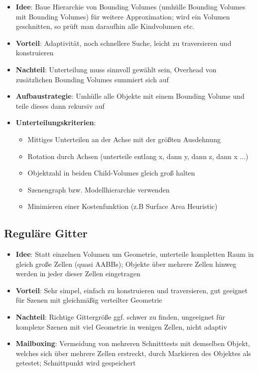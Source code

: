 \begin{itemize}
	\item \textbf{Idee}: Baue Hierarchie von Bounding Volumes (umhülle Bounding Volumes mit Bounding Volumes) für weitere Approximation; wird ein Volumen geschnitten, so prüft man daraufhin alle Kindvolumen etc.
	\item \textbf{Vorteil}: Adaptivität, noch schnellere Suche, leicht zu traversieren und konstruieren
	\item \textbf{Nachteil}: Unterteilung muss sinnvoll gewählt sein, Overhead von zusätzlichen Bounding Volumes summiert sich auf
	\item \textbf{Aufbaustrategie}: Umhülle alle Objekte mit einem Bounding Volume und teile dieses dann rekursiv auf
	\item \textbf{Unterteilungskriterien}:
	\begin{itemize}
		\item Mittiges Unterteilen an der Achse mit der größten Ausdehnung
		\item Rotation durch Achsen (unterteile entlang x, dann y, dann z, dann x ...)
		\item Objektzahl in beiden Child-Volumes gleich groß halten
		\item Szenengraph bzw. Modellhierarchie verwenden
		\item Minimieren einer Kostenfunktion (z.B Surface Area Heuristic)
	\end{itemize}
\end{itemize}

\subsection{Reguläre Gitter}%
\label{ds:sub:regulaere_gitter}

\begin{itemize}
	\item \textbf{Idee}: Statt einzelnen Volumen um Geometrie, unterteile kompletten Raum in gleich große Zellen (quasi AABBs); Objekte über mehrere Zellen hinweg werden in jeder dieser Zellen eingetragen
	\item \textbf{Vorteil}: Sehr simpel, einfach zu konstruieren und traversieren, gut geeignet für Szenen mit gleichmäßig verteilter Geometrie
	\item \textbf{Nachteil}: Richtige Gittergröße ggf. schwer zu finden, ungeeignet für komplexe Szenen mit viel Geometrie in wenigen Zellen, nicht adaptiv
	\item \textbf{Mailboxing}: Vermeidung von mehreren Schnitttests mit demselben Objekt, welches sich über mehrere Zellen erstreckt, durch Markieren des Objektes als getestet; Schnittpunkt wird gespeichert
\end{itemize}

